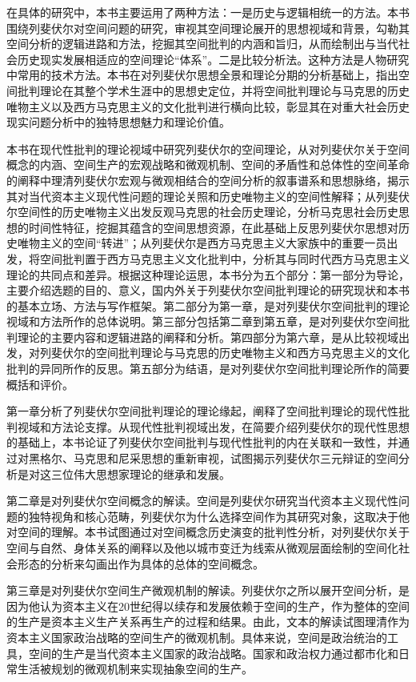 \documentclass[UTF8, fontset = sourcesans, a4paper, oneside, zihao =
-4, scheme=chinese, no-math, space=true]{ctexbook}
\begin{document}
在具体的研究中，本书主要运用了两种方法：一是历史与逻辑相统一的方法。本书围绕列斐伏尔对空间问题的研究，审视其空间理论展开的思想视域和背景，勾勒其空间分析的逻辑进路和方法，挖掘其空间批判的内涵和旨归，从而绘制出与当代社会历史现实发展相适应的空间理论``体系''。二是比较分析法。这种方法是人物研究中常用的技术方法。本书在对列斐伏尔思想全景和理论分期的分析基础上，指出空间批判理论在其整个学术生涯中的思想史定位，并将空间批判理论与马克思的历史唯物主义以及西方马克思主义的文化批判进行横向比较，彰显其在对重大社会历史现实问题分析中的独特思想魅力和理论价值。

本书在现代性批判的理论视域中研究列斐伏尔的空间理论，从对列斐伏尔关于空间概念的内涵、空间生产的宏观战略和微观机制、空间的矛盾性和总体性的空间革命的阐释中理清列斐伏尔宏观与微观相结合的空间分析的叙事谱系和思想脉络，揭示其对当代资本主义现代性问题的理论关照和历史唯物主义的空间性解释；从列斐伏尔空间性的历史唯物主义出发反观马克思的社会历史理论，分析马克思社会历史思想的时间性特征，挖掘其蕴含的空间思想资源，在此基础上反思列斐伏尔思想对历史唯物主义的空间``转进''；从列斐伏尔是西方马克思主义大家族中的重要一员出发，将空间批判置于西方马克思主义文化批判中，分析其与同时代西方马克思主义理论的共同点和差异。根据这种理论运思，本书分为五个部分：第一部分为导论，主要介绍选题的目的、意义，国内外关于列斐伏尔空间批判理论的研究现状和本书的基本立场、方法与写作框架。第二部分为第一章，是对列斐伏尔空间批判的理论视域和方法所作的总体说明。第三部分包括第二章到第五章，是对列斐伏尔空间批判理论的主要内容和逻辑进路的阐释和分析。第四部分为第六章，是从比较视域出发，对列斐伏尔的空间批判理论与马克思的历史唯物主义和西方马克思主义的文化批判的异同所作的反思。第五部分为结语，是对列斐伏尔空间批判理论所作的简要概括和评价。

第一章分析了列斐伏尔空间批判理论的理论缘起，阐释了空间批判理论的现代性批判视域和方法论支撑。从现代性批判视域出发，在简要介绍列斐伏尔的现代性思想的基础上，本书论证了列斐伏尔空间批判与现代性批判的内在关联和一致性，并通过对黑格尔、马克思和尼采思想的重新审视，试图揭示列斐伏尔三元辩证的空间分析是对这三位伟大思想家理论的继承和发展。

第二章是对列斐伏尔空间概念的解读。空间是列斐伏尔研究当代资本主义现代性问题的独特视角和核心范畴，列斐伏尔为什么选择空间作为其研究对象，这取决于他对空间的理解。本书试图通过对空间概念历史演变的批判性分析，对列斐伏尔关于空间与自然、身体关系的阐释以及他以城市变迁为线索从微观层面绘制的空间化社会形态的分析来勾画出作为具体的总体的空间概念。

第三章是对列斐伏尔空间生产微观机制的解读。列斐伏尔之所以展开空间分析，是因为他认为资本主义在20世纪得以续存和发展依赖于空间的生产，作为整体的空间的生产是资本主义生产关系再生产的过程和结果。由此，文本的解读试图理清作为资本主义国家政治战略的空间生产的微观机制。具体来说，空间是政治统治的工具，空间的生产是当代资本主义国家的政治战略。国家和政治权力通过都市化和日常生活被规划的微观机制来实现抽象空间的生产。
\end{document}
